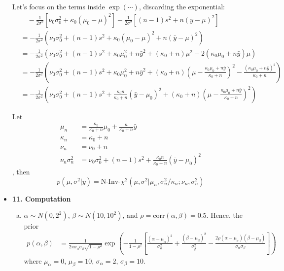 \documentclass{article}
\begin{document}
\begin{itemize}
Let's focus on the terms inside $\exp (\cdots)$, discarding the exponential:
\begin{align*}
&\quad -\frac{1}{2\sigma^2} [\nu_0 \sigma_0^2 + \kappa_0 (\mu_0 - \mu)^2] -\frac{1}{2\sigma^2}[(n-1)s^2 + n (\bar y - \mu)^2] \\
&= -\frac{1}{2\sigma^2} \left ( \nu_0\sigma_0^2 + (n-1)s^2 + \kappa_0 (\mu_0 - \mu)^2 + n (\bar y - \mu)^2 \right) \\
&= -\frac{1}{2\sigma^2} \left ( \nu_0\sigma_0^2 + (n-1)s^2  + \kappa_0 \mu_0^2 + n {\bar y}^2 + (\kappa_0 + n) \mu^2 - 2(\kappa_0 \mu_0 + n \bar y) \mu \right ) \\
&= -\frac{1}{2\sigma^2} \left ( \nu_0\sigma_0^2 + (n-1)s^2  + \kappa_0 \mu_0^2 + n {\bar y}^2 + (\kappa_0 + n) \left( \mu - \frac{\kappa_0 \mu_0 + n \bar y}{\kappa_0 + n} \right) ^2  - \frac{(\kappa_0 \mu_0 + n \bar y)^2}{\kappa_0 + n}\right ) \\
&= -\frac{1}{2\sigma^2} \left ( \nu_0\sigma_0^2 + (n-1)s^2  + \frac{\kappa_0 n}{\kappa_0 + n} (\bar y - \mu_0)^2  +  (\kappa_0 + n) \left( \mu - \frac{\kappa_0 \mu_0 + n \bar y}{\kappa_0 + n} \right) ^2 \right)
\end{align*}

Let 
\begin{align*}
\mu_n &= \frac{\kappa_0}{\kappa_0 + n} \mu_0 + \frac{n}{\kappa_0 + n} \bar y  \\
\kappa_n &= \kappa_0 + n \\
\nu_n &= \nu_0 + n \\
\nu_n \sigma_n^2 &= \nu_0\sigma_0^2 + (n-1)s^2  + \frac{\kappa_0 n}{\kappa_0 + n} (\bar y - \mu_0)^2
\end{align*}
, then
$$
p(\mu, \sigma^2 | y) = \text{N-Inv-} \chi^2 (\mu, \sigma^2 | \mu_n, \sigma_n^2 / \kappa_n; \nu_n, \sigma_n^2)
$$


\item \textbf{11. Computation}

\begin{enumerate}[(a)] 

\item $\alpha \sim N(0, 2^2)$, $\beta \sim N(10, 10^2)$, and $\rho = \text{corr}(\alpha, \beta) = 0.5$. Hence, the prior 
\begin{align*}
p(\alpha, \beta) &= \frac{1}{2\pi \sigma_{\alpha}\sigma_{\beta} \sqrt{1-\rho^2}} \exp \left( -\frac{1}{1-\rho^2} \left[ \frac{(\alpha- \mu_{\alpha})^2}{\sigma_{\alpha}^2}  + \frac{(\beta- \mu_{\beta})^2}{\sigma_{\beta}^2} - \frac{2\rho (\alpha-\mu_{\sigma}) (\beta -\mu_{\beta})}{\sigma_{\alpha} \sigma_{\beta}} \right]\right)
\end{align*}
where $\mu_{\alpha} =0$, $\mu_{\beta} = 10$, $\sigma_{\alpha} =2$, $\sigma_{\beta} = 10$.


\end{enumerate}
\end{itemize}
\end{document}
